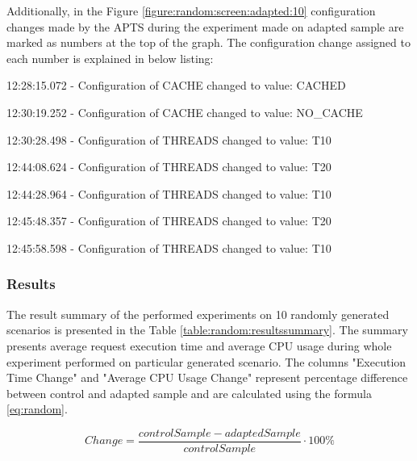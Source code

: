 \documentclass[12pt,a4paper]{article}
\let\tmpone\enumerate
\let\tmptwo\endenumerate
\renewenvironment{enumerate}{\tmpone\addtolength{\itemsep}{-0.4\baselineskip}}{\tmptwo}
\begin{document}
Additionally, in the Figure \ref{figure:random:screen:adapted:10} configuration changes made by the APTS during the experiment made on adapted sample are marked as numbers at the top of the graph. The configuration change assigned to each number is explained in below listing: 

\begin{enumerate}
\item 12:28:15.072 - Configuration of CACHE changed to value: CACHED
\item 12:30:19.252 - Configuration of CACHE changed to value: NO\_CACHE
\item 12:30:28.498 - Configuration of THREADS changed to value: T10
\item 12:44:08.624 - Configuration of THREADS changed to value: T20
\item 12:44:28.964 - Configuration of THREADS changed to value: T10
\item 12:45:48.357 - Configuration of THREADS changed to value: T20
\item 12:45:58.598 - Configuration of THREADS changed to value: T10
\end{enumerate}

\subsubsection{Results} 

The result summary of the performed experiments on 10 randomly generated scenarios is presented in the Table \ref{table:random:resultssummary}. The summary presents average request execution time and average CPU usage during whole experiment performed on particular generated scenario. The columns "Execution Time Change" and "Average CPU Usage Change" represent percentage difference between control and adapted sample and are calculated using the formula \eqref{eq:random}.

\begin{equation} \label{eq:random}
Change=\frac{controlSample-adaptedSample}{controlSample} \cdot 100\%
\end{equation}
\end{document}
